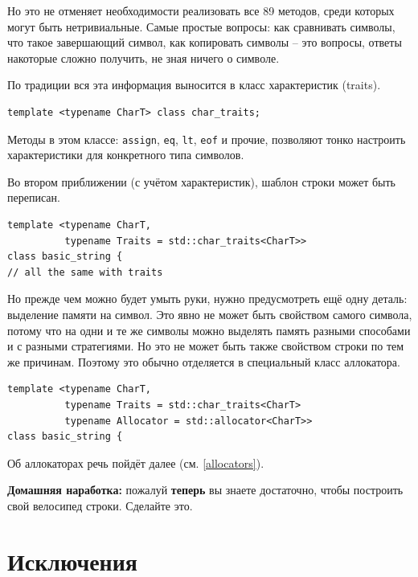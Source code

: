 \documentclass[a4paper,12pt,oneside]{book}
\newif\ifmoderncpp
\begin{document}
Но это не отменяет необходимости реализовать все 89 методов, среди которых могут быть нетривиальные. Самые простые вопросы: как сравнивать символы, что такое завершающий символ, как копировать символы -- это вопросы, ответы накоторые сложно получить, не зная ничего о символе.

По традиции вся эта информация выносится в класс характеристик (traits). 

\ifmoderncpp
Техника характеристик типов уже была описана в (\ref{sub:traits}), это её применение.
\fi

\begin{lstlisting}
template <typename CharT> class char_traits;
\end{lstlisting}

Методы в этом классе: \lstinline!assign!, \lstinline!eq!, \lstinline!lt!, \lstinline!eof! и прочие, позволяют тонко настроить характеристики для конкретного типа символов.

Во втором приближении (с учётом характеристик), шаблон строки может быть переписан.

\begin{lstlisting}
template <typename CharT,
          typename Traits = std::char_traits<CharT>> 
class basic_string {
// all the same with traits
\end{lstlisting}

Но прежде чем можно будет умыть руки, нужно предусмотреть ещё одну деталь: выделение памяти на символ. Это явно не может быть свойством самого символа, потому что на одни и те же символы можно выделять память разными способами и с разными стратегиями. Но это не может быть также свойством строки по тем же причинам. Поэтому это обычно отделяется в специальный класс аллокатора.

\begin{lstlisting}
template <typename CharT,
          typename Traits = std::char_traits<CharT>
          typename Allocator = std::allocator<CharT>> 
class basic_string {
\end{lstlisting}

Об аллокаторах речь пойдёт далее (см. \ref{allocators}).

\textbf{Домашняя наработка:} пожалуй \textbf{теперь} вы знаете достаточно, чтобы построить свой велосипед строки. Сделайте это.

\pagebreak
\section{Исключения}\label{subsec:exceptions}
\end{document}
